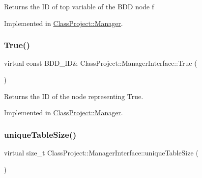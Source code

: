 \begin{DoxyReturn}{Returns}
the ID of top variable of the B\+DD node f 
\end{DoxyReturn}


Implemented in \hyperlink{classClassProject_1_1Manager_a8ddf48759e4e3a5c9e92b07470372b7e}{Class\+Project\+::\+Manager}.

\mbox{\label{classClassProject_1_1ManagerInterface_a104d0e8bcbd81eb501b66db6e24d1f63}} 
\subsubsection{\texorpdfstring{True()}{True()}}
{\footnotesize\ttfamily virtual const B\+D\+D\+\_\+\+ID\& Class\+Project\+::\+Manager\+Interface\+::\+True (\begin{DoxyParamCaption}{ }\end{DoxyParamCaption})\hspace{0.3cm}{\ttfamily [pure virtual]}}

\begin{DoxyReturn}{Returns}
the ID of the node representing True. 
\end{DoxyReturn}


Implemented in \hyperlink{classClassProject_1_1Manager_a0c15aff167a7019502b66100c4ec0a33}{Class\+Project\+::\+Manager}.

\mbox{\label{classClassProject_1_1ManagerInterface_a85cac80444b26e5b80eb96b9f1231c0e}} 
\subsubsection{\texorpdfstring{unique\+Table\+Size()}{uniqueTableSize()}}
{\footnotesize\ttfamily virtual size\+\_\+t Class\+Project\+::\+Manager\+Interface\+::unique\+Table\+Size (\begin{DoxyParamCaption}{ }\end{DoxyParamCaption})\hspace{0.3cm}{\ttfamily [pure virtual]}}

